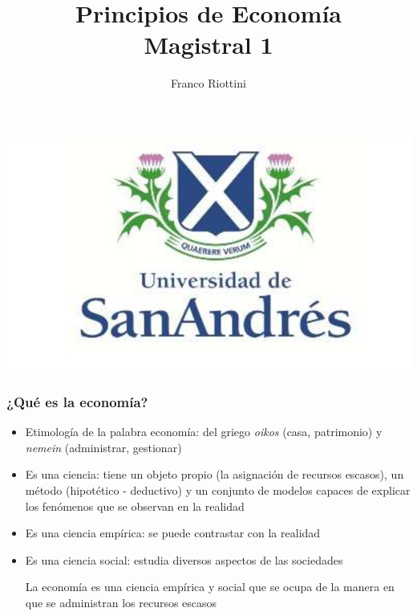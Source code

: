 \documentclass{beamer}
\title[Principios de Economía]{Principios de Economía \vspace{4mm} \\
Magistral 1}
\date{}
\author[Riottini]{Franco Riottini}
\institute[]{Universidad de San Andrés}
\begin{document}
\begin{frame}
\titlepage
\centering
\includegraphics[scale=0.2]{../Figures/logoUDESA.jpg} 
\end{frame}



\begin{frame}
\frametitle{¿Qué es la economía?}
\begin{itemize}
    \item Etimología de la palabra economía: del griego \textit{oikos} (casa, patrimonio) y \textit{nemein} (administrar, gestionar) \vspace{2mm}
    \item Es una ciencia: tiene un objeto propio (la asignación de recursos escasos), un método (hipotético - deductivo) y un conjunto de modelos capaces de explicar los fenómenos que se observan en la realidad
    \item Es una ciencia empírica: se puede contrastar con la realidad 
    \item Es una ciencia social: estudia diversos aspectos de las sociedades
    \vspace{2mm}
    \begin{center}
        La economía es una ciencia empírica y social que se ocupa de la manera en que se administran los recursos escasos
    \end{center}
\end{itemize}
\end{frame}
\end{document}
